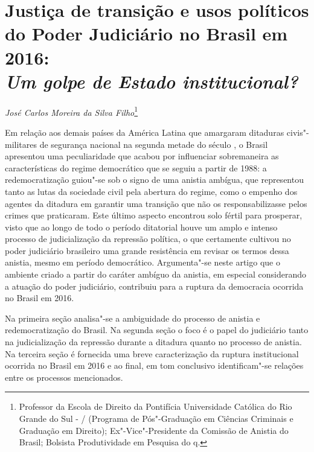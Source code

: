 \chapter*{Justiça de transição e usos políticos do Poder Judiciário
no Brasil em 2016:\\
\emph{Um golpe de Estado institucional?}}


\begin{flushright}
\emph{José Carlos Moreira da Silva Filho}\footnote{Professor da Escola
  de Direito da Pontifícia Universidade Católica do Rio Grande do Sul -
  / (Programa de Pós"-Graduação em Ciências Criminais e Graduação em
  Direito); Ex"-Vice"-Presidente da Comissão de Anistia do Brasil;
  Bolsista Produtividade em Pesquisa do q.}
\end{flushright}

Em relação aos demais países da América Latina que amargaram ditaduras
civis"-militares de segurança nacional na segunda metade do século , o
Brasil apresentou uma peculiaridade que acabou por influenciar
sobremaneira as características do regime democrático que se seguiu a
partir de 1988: a redemocratização guiou"-se sob o signo de uma anistia
ambígua, que representou tanto as lutas da sociedade civil pela abertura
do regime, como o empenho dos agentes da ditadura em garantir uma
transição que não os responsabilizasse pelos crimes que praticaram. Este
último aspecto encontrou solo fértil para prosperar, visto que ao longo
de todo o período ditatorial houve um amplo e intenso processo de
judicialização da repressão política, o que certamente cultivou no poder
judiciário brasileiro uma grande resistência em revisar os termos dessa
anistia, mesmo em período democrático. Argumenta"-se neste artigo que o
ambiente criado a partir do caráter ambíguo da anistia, em especial
considerando a atuação do poder judiciário, contribuiu para a ruptura da
democracia ocorrida no Brasil em 2016.

Na primeira seção analisa"-se a ambiguidade do processo de anistia e
redemocratização do Brasil. Na segunda seção o foco é o papel do
judiciário tanto na judicialização da repressão durante a ditadura
quanto no processo de anistia. Na terceira seção é fornecida uma breve
caracterização da ruptura institucional ocorrida no Brasil em 2016 e ao
final, em tom conclusivo identificam"-se relações entre os processos
mencionados.

